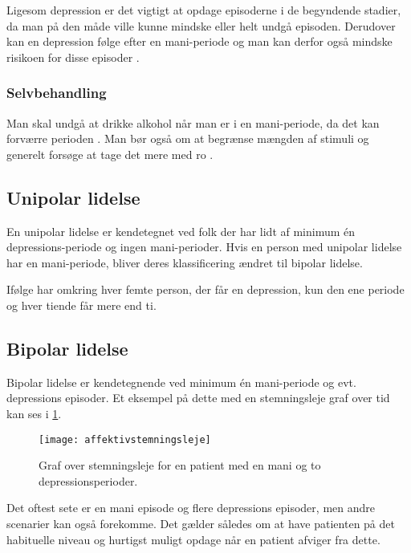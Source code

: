 Ligesom depression er det vigtigt at opdage episoderne i de begyndende stadier, da man på den måde ville kunne mindske eller helt undgå episoden.
Derudover kan en depression følge efter en mani-periode og man kan derfor også mindske risikoen for disse episoder \citep{misc:bipolarsundhed}.

\subsubsection{Selvbehandling}
Man skal undgå at drikke alkohol når man er i en mani-periode, da det kan forværre perioden \citep{misc:netpsykmani}.
Man bør også om at begrænse mængden af stimuli og generelt forsøge at tage det mere med ro \citep{misc:janne-rasmussen}.

\subsection{Unipolar lidelse}
En unipolar lidelse er kendetegnet ved folk der har lidt af minimum én depressions-periode og ingen mani-perioder.
Hvis en person med unipolar lidelse har en mani-periode, bliver deres klassificering ændret til bipolar lidelse.

Ifølge \citet{misc:netpsykdepression} har omkring hver femte person, der får en depression, kun den ene periode og hver tiende får mere end ti.

\subsection{Bipolar lidelse}
Bipolar lidelse er kendetegnende ved minimum én mani-periode og evt. depressions episoder.
Et eksempel på dette med en stemningsleje graf over tid kan ses i \cref{fig:stemningslejegrafeksempel}.

\begin{figure}
	\centering
	\texttt{[image: affektivstemningsleje]}
	\caption{Graf over stemningsleje for en patient med en mani og to depressionsperioder.}\label{fig:stemningslejegrafeksempel}
\end{figure}

Det oftest sete er en mani episode og flere depressions episoder, men andre scenarier kan også forekomme.
Det gælder således om at have patienten på det habituelle niveau og hurtigst muligt opdage når en patient afviger fra dette.